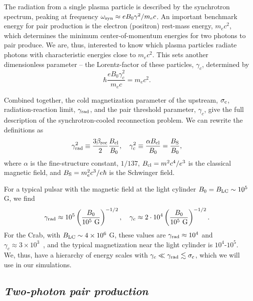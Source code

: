 The radiation from a single plasma particle is described by the synchrotron spectrum, peaking at frequency $\omega_{\rm syn}\approx eB_0\gamma^2 / m_e c$. An important benchmark energy for pair production is the electron (positron) rest-mass energy, $m_e c^2$, which determines the minimum center-of-momentum energies for two photons to pair produce. We are, thus, interested to know which plasma particles radiate photons with characteristic energies close to $m_e c^2$. This sets another dimensionless parameter -- the Lorentz-factor of these particles, $\gamma_c$, determined by
\begin{equation}
    \label{eq:def_gammac}
    \hbar \frac{e B_0 \gamma_c^2}{m_e c}= m_e c^2.
\end{equation}

Combined together, the cold magnetization parameter of the upstream, $\sigma_{\rm c}$, radiation-reaction limit, $\gamma_{\rm rad}$, and the pair threshold parameter, $\gamma_c$, give the full description of the synchrotron-cooled reconnection problem. We can rewrite the definitions as
\begin{equation}
\label{eq:def_gammas}
    \gamma_{\rm rad}^2 \equiv \frac{3\beta_{\rm rec}}{2}\frac{B_{\rm cl}}{B_0},~~~
    \gamma_c^2 \equiv \frac{\alpha B_{\rm cl}}{B_0} = \frac{B_{\rm S}}{B_0},
\end{equation}
where $\alpha$ is the fine-structure constant, $1/137$, $B_{\rm cl}=m^2 c^4/e^3$ is the classical magnetic field, and $B_{\rm S}=m_e^2 c^3/e\hbar$ is the Schwinger field.

For a typical pulsar with the magnetic field at the light cylinder $B_0 = B_{\rm LC} \sim 10^{5}$ G, we find
\begin{equation}\label{eq:rad_c_values}
    \gamma_{\rm rad} \approx 10^5 \left(\frac{B_0}{10^{5}~\textrm{G}}\right)^{-1/2},~~~
    \gamma_c \approx 2\cdot 10^4 \left(\frac{B_0}{10^{5}~\textrm{G}}\right)^{-1/2}.
\end{equation}
For the Crab, with $B_{\rm LC}\sim 4\times 10^6$ G, these values are $\gamma_{\rm rad}\approx 10^4$ and $\gamma_c\approx 3\times 10^3$~\citep{2014ApJ...780....3U}, and the typical magnetization near the light cylinder is $10^4\text{-}10^5$. We, thus, have a hierarchy of energy scales with $\gamma_c \ll \gamma_{\rm rad} \lesssim \sigma_{\rm c}$, which we will use in our simulations.

\subsection*{\small \it Two-photon pair production}

